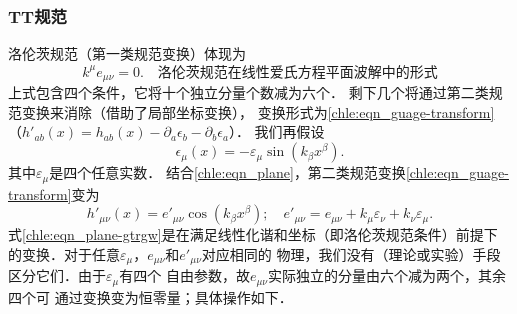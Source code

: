 \subsubsection{TT规范}
洛伦茨规范（第一类规范变换）体现为
\begin{equation}\label{chle:eqn_Lorenz-GW}
    k^\mu e_{\mu\nu} =0 .\quad
    \text{洛伦茨规范在线性爱氏方程平面波解中的形式}
\end{equation}
上式包含四个条件，它将十个独立分量个数减为六个．
剩下几个将通过第二类规范变换来消除（借助了局部坐标变换），
变换形式为\eqref{chle:eqn_guage-transform}
（${h'}_{ab}(x)={h}_{ab}(x) -\partial_a \epsilon_b - \partial_b \epsilon_a$）．
我们再假设
\begin{equation}\label{chle:eqn_tmplc}
    \epsilon_\mu(x)=-\varepsilon_\mu \sin(k_\beta x^\beta).
\end{equation}
其中$\varepsilon_\mu$是四个任意实数．
结合\eqref{chle:eqn_plane}，第二类规范变换\eqref{chle:eqn_guage-transform}变为
\begin{equation}\label{chle:eqn_plane-gtrgw}
    {h'}_{\mu\nu}(x)=e'_{\mu\nu} \cos(k_\beta x^\beta);\quad
    e'_{\mu\nu}=e_{\mu\nu}+ k_\mu \varepsilon_\nu + k_\nu \varepsilon_\mu .
\end{equation}
式\eqref{chle:eqn_plane-gtrgw}是在满足线性化谐和坐标（即洛伦茨规范条件）前提下
的变换．对于任意$\varepsilon_\mu$，$e_{\mu\nu}$和$e'_{\mu\nu}$对应相同的
物理，我们没有（理论或实验）手段区分它们．由于$\varepsilon_\mu$有四个
自由参数，故$e_{\mu\nu}$实际独立的分量由六个减为两个，其余四个可
通过变换变为恒零量；具体操作如下．

